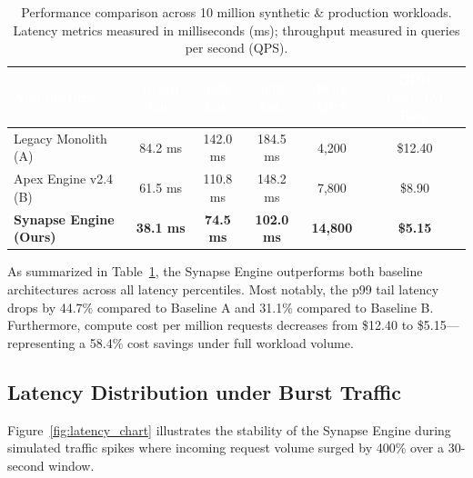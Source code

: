 \documentclass[10pt, a4paper]{article}
\begin{document}
\vspace{8pt}

\begin{table}[htbp]
\centering
\caption{Performance comparison across 10 million synthetic \& production workloads. Latency metrics measured in milliseconds (ms); throughput measured in queries per second (QPS).}
\label{tab:performance}
\vspace{6pt}
\small\sffamily
{}
\begin{tabular}{lccccc}
\toprule
\rowcolor{SummitNavy}
\textcolor{white}{\textbf{Architecture}} & \textcolor{white}{\textbf{Mean Lat.}} & \textcolor{white}{\textbf{p95 Lat.}} & \textcolor{white}{\textbf{p99 Lat.}} & \textcolor{white}{\textbf{Peak QPS}} & \textcolor{white}{\textbf{GPU Cost/1M Req.}} \\
\midrule
Legacy Monolith (A) & 84.2 ms & 142.0 ms & 184.5 ms & 4,200 & \$12.40 \\{}
Apex Engine v2.4 (B) & 61.5 ms & 110.8 ms & 148.2 ms & 7,800 & \$8.90 \\{}
\textbf{Synapse Engine (Ours)} & \textbf{38.1 ms} & \textbf{74.5 ms} & \textbf{102.0 ms} & \textbf{14,800} & \textbf{\$5.15} \\
\bottomrule
\end{tabular}
\end{table}

As summarized in Table~\ref{tab:performance}, the Synapse Engine outperforms both baseline architectures across all latency percentiles. Most notably, the p99 tail latency drops by 44.7\% compared to Baseline A and 31.1\% compared to Baseline B. Furthermore, compute cost per million requests decreases from \$12.40 to \$5.15---representing a 58.4\% cost savings under full workload volume.

\vspace{10pt}

\subsection{Latency Distribution under Burst Traffic}
Figure~\ref{fig:latency_chart} illustrates the stability of the Synapse Engine during simulated traffic spikes where incoming request volume surged by 400\% over a 30-second window.
\end{document}

